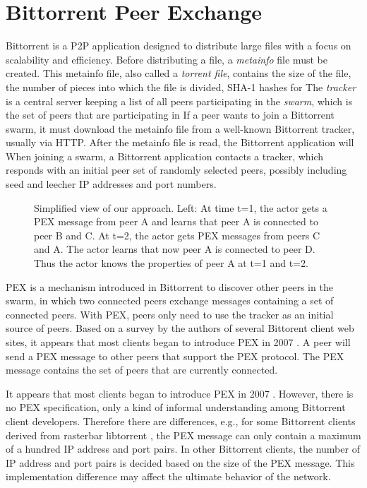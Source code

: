 \documentclass[paper]{ieice}
\begin{document}
\section{Bittorrent Peer Exchange}\label{background}
Bittorrent is a P2P application designed to distribute large files with a focus on scalability and efficiency.  
Before distributing a file, a \textit{metainfo} file must be created.  
This metainfo file, also called a \textit{torrent file}, contains the size of the file, the number of pieces into which the file is divided, SHA-1 hashes for %
The \textit{tracker} is a central server keeping a list of all peers participating in the \textit{swarm}, which is the set of peers that are participating in %
If a peer wants to join a Bittorrent swarm, it must download the metainfo file from a well-known Bittorrent tracker, usually via HTTP. 
After the metainfo file is read, the Bittorrent application will 
When joining a swarm, a Bittorrent application contacts a tracker, which responds with an initial peer set of randomly selected peers, possibly including seed and leecher IP addresses and port numbers.  
\begin{figure}
\centering
{}
\caption{Simplified view of our approach. Left: At time t=1, the actor gets a PEX message from peer A and
learns that peer A is connected to peer B and C. At t=2, the actor gets  PEX messages from peers C and A. The actor
learns that now peer A is connected to peer D. Thus the actor knows the properties of peer A at t=1 and t=2.} 
\label{fig:pexworks}
\vspace{-2mm}
\end{figure}
PEX is a mechanism introduced in Bittorrent to discover other peers in the swarm, in which two connected peers exchange messages containing a set of connected peers.  
With PEX, peers only need to use the tracker as an initial source of peers.   
Based on a survey by the authors of several Bittorent client web sites, it appears that most clients began to introduce PEX in 2007 \cite{client}.
A peer will send a PEX message to other peers that support the PEX protocol. 
The PEX message contains the set of peers that are currently connected.

It appears that most clients began to introduce PEX in 2007  \cite{client}. 
However, there is no PEX specification, only a kind of informal understanding among Bittorrent client developers.
Therefore there are differences, e.g., for some Bittorrent clients derived from rasterbar libtorrent \cite{rasterbar}, the PEX message can only contain a maximum of a hundred IP address and port pairs. 
In other Bittorrent clients, the number of IP address and port pairs is decided based on the size of the PEX message.  
This implementation difference may affect the ultimate behavior of the network.
\end{document}
